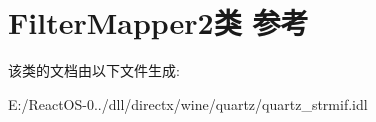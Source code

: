 \hypertarget{class_filter_mapper2}{}\section{Filter\+Mapper2类 参考}
\label{class_filter_mapper2}


该类的文档由以下文件生成\+:\begin{DoxyCompactItemize}
\item 
E\+:/\+React\+O\+S-\/0../dll/directx/wine/quartz/quartz\+\_\+strmif.\+idl\end{DoxyCompactItemize}
